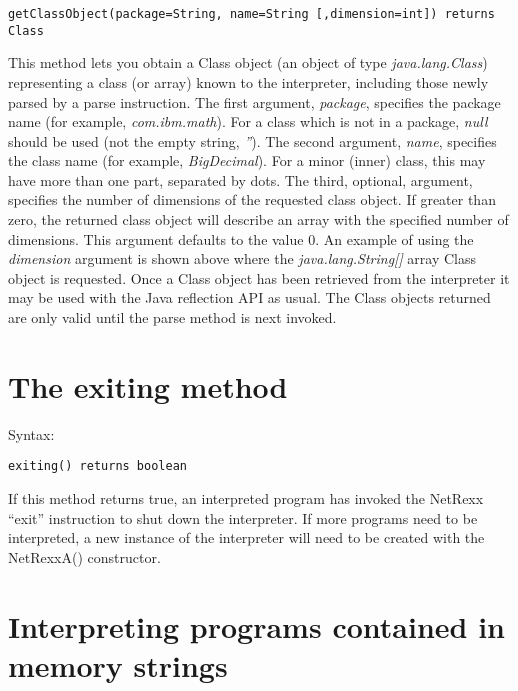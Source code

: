 \begin{lstlisting}[label=getclassobject,caption=getClassObject]
getClassObject(package=String, name=String [,dimension=int]) returns Class
\end{lstlisting}

This method lets you obtain a Class object (an object of
type \emph{java.lang.Class})  representing a class (or array) known to
the interpreter, including those newly parsed by a parse instruction.
\newline
The first argument, \emph{package}, specifies the package name (for
example, \emph{com.ibm.math}).  For a class which is not in a
package, \emph{null} should be used (not the empty string, \emph{''}).
\newline
The second argument, \emph{name}, specifies the class name (for example,
\emph{BigDecimal}).  For a minor (inner) class, this may have
more than one part, separated by dots.
\newline
The third, optional, argument, specifies the number of dimensions of
the requested class object.  If greater than zero, the returned class
object will describe an array with the specified number of dimensions.
This argument defaults to the value 0.
\newline
An example of using the \emph{dimension} argument is shown above where
the \emph{java.lang.String[]} array Class object is requested.
\newline
Once a Class object has been retrieved from the interpreter it may be
used with the Java reflection API as usual.  The Class objects returned
are only valid until the parse method is next invoked.


\section{The exiting method}

Syntax:
\begin{lstlisting}[label=exiting,caption=exiting]
exiting() returns boolean
\end{lstlisting}
If this method returns true, an interpreted program has invoked the NetRexx “exit” instruction to shut down the interpreter. If more programs need to be interpreted, a new instance of the interpreter will need to be created with the NetRexxA() constructor.

\section{Interpreting programs contained in memory strings}\label{interpretstrings}

